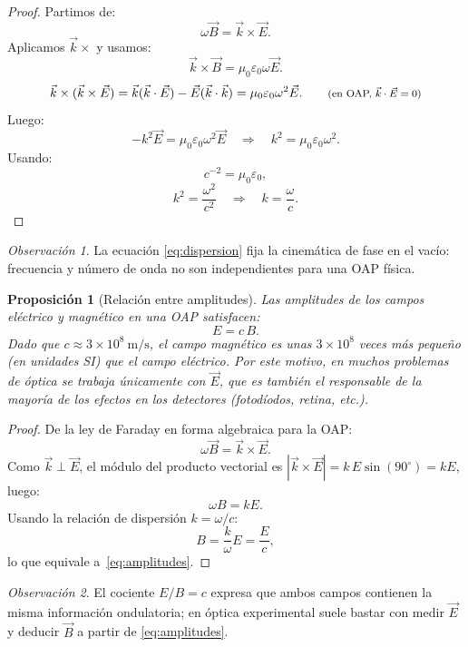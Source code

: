 \documentclass[12pt, a4paper]{article}
\theoremstyle{plain}
\newtheorem{proposicion}[teorema]{Proposición}
\theoremstyle{definition}
\theoremstyle{remark}
\newtheorem*{observacion}{Observación}
\newcommand{\ve}[1]{\vec{#1}}
\begin{document}
\begin{proof}
Partimos de:
\[
  \omega\ve{B}=\ve{k}\times\ve{E}.
\]
Aplicamos $\ve{k}\times$ y usamos:
\[
  \ve{k}\times\ve{B}=\mu_0\varepsilon_0\omega\ve{E}.
\]
\[
  \ve{k}\times(\ve{k}\times\ve{E})
  = \ve{k}(\ve{k}\cdot\ve{E})
    - \ve{E}(\ve{k}\cdot\ve{k})
  = \mu_0\varepsilon_0\omega^2\ve{E}.
  \tag*{\normalfont\footnotesize(en OAP, $\ve{k}\cdot\ve{E}=0$)}
\]
Luego:
\[
  -k^2\ve{E}=\mu_0\varepsilon_0\omega^2\ve{E}
  \quad\Rightarrow\quad
  k^2=\mu_0\varepsilon_0\omega^2.
\]
Usando:
\[
  c^{-2}=\mu_0\varepsilon_0,
\]
\[
  k^2=\frac{\omega^2}{c^2}
  \quad\Rightarrow\quad
  k=\frac{\omega}{c}.
\]
\end{proof}

\begin{observacion}
La ecuación \eqref{eq:dispersion} fija la cinemática de fase en el vacío:
frecuencia y número de onda no son independientes para una OAP física.
\end{observacion}

\begin{proposicion}[Relación entre amplitudes]
Las amplitudes de los campos eléctrico y magnético en una OAP satisfacen:
\begin{equation}
  E = c\,B. \label{eq:amplitudes}
\end{equation}
Dado que $c \approx 3\times10^8\ \mathrm{m/s}$, el campo magnético es unas
$3\times10^8$ veces más pequeño (en unidades SI) que el campo eléctrico. Por
este motivo, en muchos problemas de óptica se trabaja únicamente con $\ve{E}$,
que es también el responsable de la mayoría de los efectos en los detectores
(fotodíodos, retina, etc.).
\end{proposicion}

\begin{proof}
De la ley de Faraday en forma algebraica para la OAP:
\[
  \omega\ve{B}=\ve{k}\times\ve{E}.
\]
Como $\ve{k}\perp\ve{E}$, el módulo del producto vectorial es
$|\ve{k}\times\ve{E}| = k\,E\sin(90^\circ) = kE$, luego:
\[
  \omega B = kE.
\]
Usando la relación de dispersión $k = \omega/c$:
\[
  B = \frac{k}{\omega}E = \frac{E}{c},
\]
lo que equivale a~\eqref{eq:amplitudes}.
\end{proof}

\begin{observacion}
El cociente $E/B=c$ expresa que ambos campos contienen la misma información
ondulatoria; en óptica experimental suele bastar con medir $\ve{E}$ y deducir
$\ve{B}$ a partir de \eqref{eq:amplitudes}.
\end{observacion}
\end{document}
